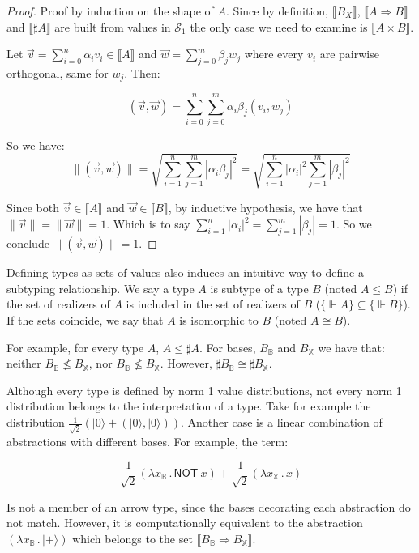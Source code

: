 \documentclass[runningheads,orivec]{llncs}
\newcommand\ket[1]{\ensuremath{|#1\rangle}}
\def\Sph{\mathcal{S}_1}       %
\def\Pair#1#2{(#1,#2)} %
\def\Lam#1#2#3{\lambda#1_{#2}\,{.}\,#3} %
\def\Arr{\Rightarrow}
\def\sem#1{\llbracket#1\rrbracket}
\def\real{\Vdash}
\newcommand\B{\mathbb B}
\newcommand\XB{\mathbb X}
\newcommand{\pauliX}[1]{\mathsf{NOT}\ #1}
\newcommand\basis[1]{\ensuremath{B_{ #1 }}}
\begin{document}
\begin{proof}
  Proof by induction on the shape of $A$. Since by definition, $\sem{\basis{X}}$, $\sem{A\Arr B}$ and $\sem{\sharp{A}}$ are built from values in $\Sph$ the only case we need to examine is $\sem{A\times B}$.
  
  Let $\vec v = \sum_{i=0}^{n} \alpha_i v_i \in\sem{A}$ and $\vec w = \sum_{j=0}^{m} \beta_j w_j$ where every $v_i$ are pairwise orthogonal, same for $w_j$. Then:
     
  \[(\vec v, \vec w) = \sum_{i=0}^{n} \sum_{j=0}^{m} \alpha_i\beta_j (v_i,w_j)\]
  
  So we have: 
  \[\|\Pair{\vec v}{\vec w}\| = \sqrt{\sum_{i=1}^n\sum_{j=1}^{m} |\alpha_i\beta_j|^2} = \sqrt{\sum_{i=1}^n |\alpha_i|^2 \sum_{j=1}^{m} |\beta_j|^2}\]

  Since both $\vec v\in\sem{A}$ and $\vec w\in\sem{B}$, by inductive hypothesis, we have that $\|\vec v\| = \| \vec w \| = 1$. Which is to say $\sum_{i=1}^{n} |\alpha_i|^2 = \sum_{j=1}^{m} |\beta_j| = 1$. So we conclude $\|\Pair{\vec{v}}{\vec{w}}\| = 1$.
  
\end{proof}

Defining types as sets of values also induces an intuitive way to define a subtyping relationship. We say a type $A$ is subtype of a type $B$ (noted $A\leq B$) if the set of realizers of $A$ is included in the set of realizers of $B$ ($\{\real A\}\subseteq\{\real B\}$). If the sets coincide, we say that $A$ is isomorphic to $B$ (noted $A\cong B$). 

\begin{example}
  For example, for every type $A$, $A\leq\sharp A$. For bases, $\basis{\B}$ and $\basis{\XB}$ we have that: neither $\basis{\B}\not\leq\basis{\XB}$, nor $\basis{\B}\not\leq\basis{\XB}$. However, $\sharp\basis{\B}\cong\sharp\basis{\XB}$.
\end{example}

Although every type is defined by norm 1 value distributions, not every norm 1 distribution belongs to the interpretation of a type. Take for example the distribution $\frac{1}{\sqrt{2}} (\ket{0} + \Pair{\ket{0}}{\ket 0})$. Another case is a linear combination of abstractions with different bases. For example, the term:

\[
\frac{1}{\sqrt{2}}(\Lam{x}{\B}{\pauliX{x}}) + \frac{1}{\sqrt{2}}(\Lam{x}{\XB}{x})
\]

Is not a member of an arrow type, since the bases decorating each abstraction do not match. However, it is computationally equivalent to the abstraction $(\Lam{x}{\B}{\ket{+}})$ which belongs to the set $\sem{\basis{\B}\Arr\basis{\XB}}$.
\end{document}
